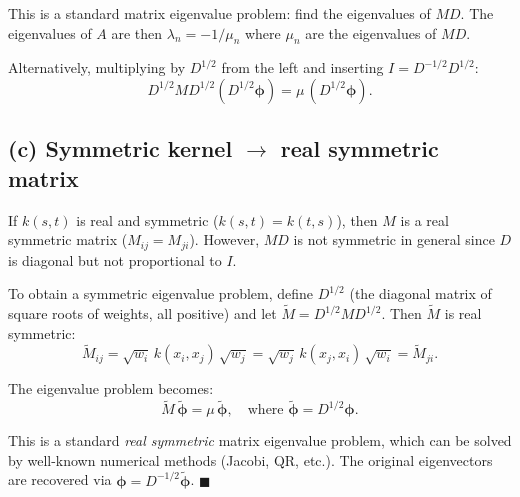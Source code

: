 \documentclass[12pt]{article}
\begin{document}
This is a standard matrix eigenvalue problem: find the eigenvalues of $MD$. The eigenvalues of $A$ are then $\lambda_n = -1/\mu_n$ where $\mu_n$ are the eigenvalues of $MD$.

Alternatively, multiplying by $D^{1/2}$ from the left and inserting $I = D^{-1/2}D^{1/2}$:
\[
D^{1/2}MD^{1/2}(D^{1/2}\boldsymbol{\phi}) = \mu\,(D^{1/2}\boldsymbol{\phi}).
\]

\subsection*{(c) Symmetric kernel $\to$ real symmetric matrix}

If $k(s,t)$ is real and symmetric ($k(s,t) = k(t,s)$), then $M$ is a real symmetric matrix ($M_{ij} = M_{ji}$). However, $MD$ is not symmetric in general since $D$ is diagonal but not proportional to $I$.

To obtain a symmetric eigenvalue problem, define $D^{1/2}$ (the diagonal matrix of square roots of weights, all positive) and let $\tilde{M} = D^{1/2}MD^{1/2}$. Then $\tilde{M}$ is real symmetric:
\[
\tilde{M}_{ij} = \sqrt{w_i}\,k(x_i, x_j)\,\sqrt{w_j} = \sqrt{w_j}\,k(x_j, x_i)\,\sqrt{w_i} = \tilde{M}_{ji}.
\]

The eigenvalue problem becomes:
\[
\tilde{M}\,\tilde{\boldsymbol{\phi}} = \mu\,\tilde{\boldsymbol{\phi}}, \quad \text{where } \tilde{\boldsymbol{\phi}} = D^{1/2}\boldsymbol{\phi}.
\]

This is a standard \emph{real symmetric} matrix eigenvalue problem, which can be solved by well-known numerical methods (Jacobi, QR, etc.). The original eigenvectors are recovered via $\boldsymbol{\phi} = D^{-1/2}\tilde{\boldsymbol{\phi}}$. \hfill $\blacksquare$
\end{document}

